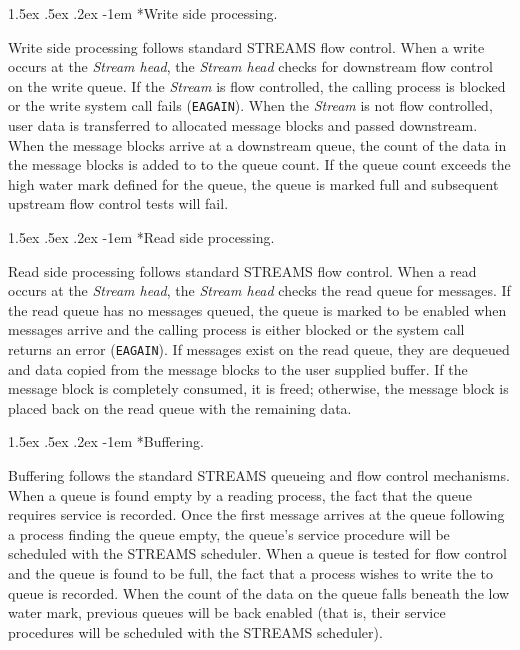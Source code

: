 \documentclass[letterpaper,final,notitlepage,twocolumn,10pt,twoside]{article}
\makeatletter
\renewcommand\paragraph{\@startsection{paragraph}{4}{\z@}%
                                    {1.5ex \@plus .5ex \@minus .2ex}%
                                    {-1em}%
                                    {\normalfont\normalsize\bfseries\slshape}}
\makeatother
\begin{document}
\paragraph*{Write side processing.}

Write side processing follows standard STREAMS flow control.  When a write
occurs at the \textit{Stream head}, the \textit{Stream head} checks for
downstream flow control on the write queue.  If the \textit{Stream} is flow
controlled, the calling process is blocked or the write system call fails
(\texttt{EAGAIN}).  When the \textit{Stream} is not flow controlled, user data
is transferred to allocated message blocks and passed downstream.  When the
message blocks arrive at a downstream queue, the count of the data in the
message blocks is added to to the queue count.  If the queue count exceeds the
high water mark defined for the queue, the queue is marked full and subsequent
upstream flow control tests will fail.

\paragraph*{Read side processing.}

Read side processing follows standard STREAMS flow control.  When a read
occurs at the \textit{Stream head}, the \textit{Stream head} checks the read
queue for messages.  If the read queue has no messages queued, the queue is
marked to be enabled when messages arrive and the calling process is either
blocked or the system call returns an error (\texttt{EAGAIN}).  If messages
exist on the read queue, they are dequeued and data copied from the message
blocks to the user supplied buffer.  If the message block is completely
consumed, it is freed; otherwise, the message block is placed back on the read
queue with the remaining data.

\paragraph*{Buffering.}

Buffering follows the standard STREAMS queueing and flow control mechanisms.
When a queue is found empty by a reading process, the fact that the queue
requires service is recorded.  Once the first message arrives at the queue
following a process finding the queue empty, the queue's service procedure
will be scheduled with the STREAMS scheduler.  When a queue is tested for flow
control and the queue is found to be full, the fact that a process wishes to
write the to queue is recorded.  When the count of the data on the queue falls
beneath the low water mark, previous queues will be back enabled (that is,
their service procedures will be scheduled with the STREAMS scheduler).
\end{document}
